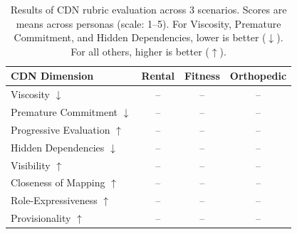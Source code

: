 \begin{table}
  \caption{Results of CDN rubric evaluation across
  3 scenarios. Scores are means across personas
  (scale: 1--5). For Viscosity, Premature Commitment,
  and Hidden Dependencies, lower is better ($\downarrow$).
  For all others, higher is better ($\uparrow$).}
  \label{tab:cdn_results}
  \begin{tabular}{lccc}
    \toprule
    CDN Dimension & Rental & Fitness & Orthopedic \\
    \midrule
    Viscosity $\downarrow$ & -- & -- & -- \\
    Premature Commitment $\downarrow$ & -- & -- & -- \\
    Progressive Evaluation $\uparrow$ & -- & -- & -- \\
    Hidden Dependencies $\downarrow$ & -- & -- & -- \\
    Visibility $\uparrow$ & -- & -- & -- \\
    Closeness of Mapping $\uparrow$ & -- & -- & -- \\
    Role-Expressiveness $\uparrow$ & -- & -- & -- \\
    Provisionality $\uparrow$ & -- & -- & -- \\
    \bottomrule
  \end{tabular}
\end{table}